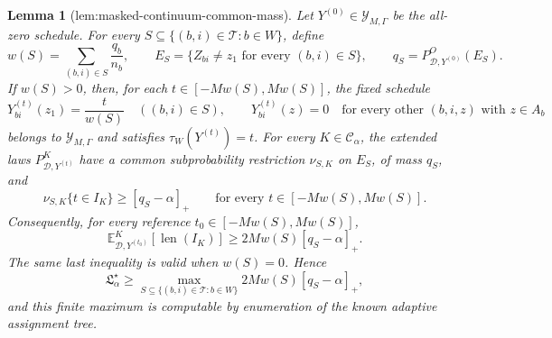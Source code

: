 \documentclass{article}
\newtheorem{lemma}{Lemma}
\begin{document}
\begin{lemma}[lem:masked-continuum-common-mass]\label{lem:masked-continuum-common-mass}
Let \(Y^{(0)}\in\mathcal Y_{M,\Gamma}\) be the all-zero schedule.  For every
\(S\subseteq\{(b,i)\in\mathcal T:b\in W\}\), define
\[
 w(S)=\sum_{(b,i)\in S}\frac{q_b}{n_b},
 \qquad
 E_S=\{Z_{bi}\ne z_1\text{ for every }(b,i)\in S\},
 \qquad
 q_S=P^O_{\mathcal D,Y^{(0)}}(E_S).
\]
If \(w(S)>0\), then, for each \(t\in[-Mw(S),Mw(S)]\), the fixed schedule
\[
 Y^{(t)}_{bi}(z_1)=\frac{t}{w(S)}\quad ((b,i)\in S),
 \qquad
 Y^{(t)}_{bi}(z)=0\quad\text{for every other }(b,i,z)\text{ with }z\in A_b
\]
belongs to \(\mathcal Y_{M,\Gamma}\) and satisfies \(\tau_W(Y^{(t)})=t\).  For every \(K\in\mathcal C_\alpha\), the extended laws \(P^K_{\mathcal D,Y^{(t)}}\) have a common subprobability restriction \(\nu_{S,K}\) on \(E_S\), of mass \(q_S\), and
\[
 \nu_{S,K}\{t\in I_K\}\ge[q_S-\alpha]_+
 \qquad\text{for every }t\in[-Mw(S),Mw(S)].
\]
Consequently, for every reference \(t_0\in[-Mw(S),Mw(S)]\),
\[
 \mathbb E^K_{\mathcal D,Y^{(t_0)}}[\operatorname{len}(I_K)]
 \ge 2Mw(S)[q_S-\alpha]_+.
\]
The same last inequality is valid when \(w(S)=0\).  Hence
\[
 \mathfrak L_\alpha^\star
 \ge
 \max_{S\subseteq\{(b,i)\in\mathcal T:b\in W\}}
 2Mw(S)[q_S-\alpha]_+,
\]
and this finite maximum is computable by enumeration of the known adaptive assignment tree.
\end{lemma}
\end{document}
